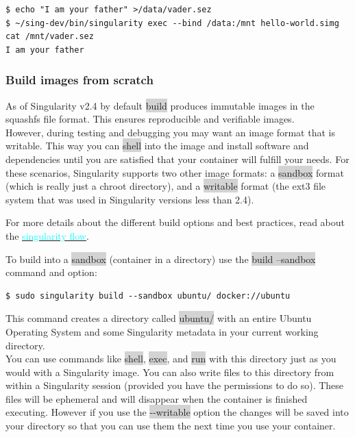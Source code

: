 \documentclass[a4paper]{article}
\newcounter{subsubsubsection}[subsubsection]
\begin{document}
\begin{lstlisting}[frame=single]
$ echo "I am your father" >/data/vader.sez
$ ~/sing-dev/bin/singularity exec --bind /data:/mnt hello-world.simg cat /mnt/vader.sez
I am your father
\end{lstlisting}

\subsubsection{Build images from scratch}
\label{sec:buildimagesfromscratch}

As of Singularity v2.4 by default \colorbox{lightgray}{build} produces immutable images in the squashfs file format. This ensures reproducible and verifiable images.\\

However, during testing and debugging you may want an image format that is writable. This way you can \colorbox{lightgray}{shell} into the image and install software and dependencies until you are satisfied that your container will fulfill your needs. For these scenarios, Singularity supports two other image formats: a \colorbox{lightgray}{sandbox} format (which is really just a chroot directory), and a \colorbox{lightgray}{writable} format (the ext3 file system that was used in Singularity versions less than 2.4).

For more details about the different build options and best practices, read about the \hyperref[sec:singularityflow]{{\textcolor{cyan}{singularity flow}}}.


To build into a \colorbox{lightgray}{sandbox} (container in a directory) use the \colorbox{lightgray}{build --sandbox} command and option:\\

\begin{lstlisting}[frame=single]
$ sudo singularity build --sandbox ubuntu/ docker://ubuntu
\end{lstlisting}

This command creates a directory called \colorbox{lightgray}{ubuntu/} with an entire Ubuntu Operating System and some Singularity metadata in your current working directory.\\

You can use commands like \colorbox{lightgray}{shell}, \colorbox{lightgray}{exec}, and \colorbox{lightgray}{run} with this directory just as you would with a Singularity image. You can also write files to this directory from within a Singularity session (provided you have the permissions to do so). These files will be ephemeral and will disappear when the container is finished executing. However if you use the \colorbox{lightgray}{-{}-writable} option the changes will be saved into your directory so that you can use them the next time you use your container.
\end{document}
